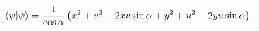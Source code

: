 \begin{equation}
\langle\psi|\psi\rangle={1\over\cos\alpha}\left(x^2+v^2+2xv\sin\alpha
+y^2+u^2-2yu\sin\alpha\right), \label{e26}
\end{equation}

